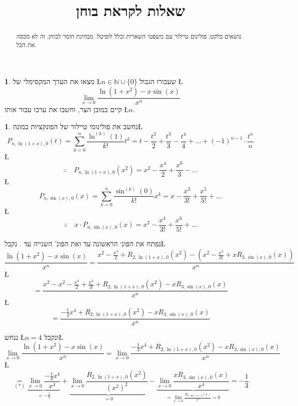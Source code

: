 \documentclass[english,hebrew]{article}
\theoremstyle{plain}
\theoremstyle{definition}
\newtheorem{problem}[thm]{\protect\problemname}
\theoremstyle{definition}
\newtheorem*{sol*}{\protect\solutionname}
\providecommand{\problemname}{בעיה}
\providecommand{\solutionname}{פתרון}
\begin{document}
\title{שאלות לקראת בוחן {\endL}}
\maketitle
\begin{abstract}
נושאים בלקט: פולינום טיילור עם משפטי השארית וכלל לופיטל. מבחינת חומר
לבוחן, זה לא מכסה את הכל.
\end{abstract}
\newpage{}
\begin{problem}
מצאו את הערך המקסימלי של \L{$n\in\mathbb{N}\cup\{0\}$} שעבורו הגבול
\L{%
\[
\lim_{x\to0}\frac{\ln(1+x^{2})-x\sin(x)}{x^{n}}
\]
}%
קיים במובן הצר, וחשבו את ערכו עבור אותו \L{$n$}.
\end{problem}

\begin{sol*}
נחשב את פולינומי טיילור של הפונקציות במונה\L{%
\[
P_{n,\ln\left(1+x\right),0}(t)=\underset{k=0}{\overset{n}{\sum}}\frac{\ln^{(k)}(1)}{k!}t^{k}=t-\frac{t^{2}}{2}+\frac{t^{3}}{3}-\frac{t^{4}}{4}+\dots+\left(-1\right)^{n-1}\cdot\frac{t^{n}}{n}
\]
}%
\L{%
\[
\therefore\quad P_{n,\ln\left(1+x\right),0}(x^{2})=x^{2}-\frac{x^{4}}{2}+\frac{x^{6}}{3}-\dots
\]
}%
\L{%
\[
P_{n,\sin(x),0}(x)=\underset{k=0}{\overset{n}{\sum}}\frac{\sin^{(k)}(0)}{k!}x^{k}=x-\frac{x^{3}}{3!}+\frac{x^{5}}{5!}+\dots
\]
}%
\L{%
\[
\therefore\quad x\cdot P_{n,\sin(x),0}(x)=x^{2}-\frac{x^{4}}{3!}+\frac{x^{6}}{5!}+\dots
\]
}%

נפתח את הפונ׳ הראשונה עד {\endL} ואת הפונ' השנייה עד {\endL}.
נקבל\L{%
\[
\frac{\ln(1+x^{2})-x\sin(x)}{x^{n}}=\frac{x^{2}-\frac{x^{4}}{2}+R_{2,\ln\left(1+x\right),0}\left(x^{2}\right)-\left(x^{2}-\frac{x^{4}}{3!}+xR_{3,\sin\left(x\right),0}(x)\right)}{x^{n}}
\]
}%
\L{%
\[
=\frac{x^{2}-x^{2}-\frac{x^{4}}{2}+\frac{x^{4}}{3!}+R_{2,\ln\left(1+x\right),0}\left(x^{2}\right)-xR_{3,\sin\left(x\right),0}(x)}{x^{n}}
\]
}%
\L{%
\[
=\frac{-\frac{1}{3}x^{4}+R_{2,\ln\left(1+x\right),0}\left(x^{2}\right)-xR_{3,\sin\left(x\right),0}(x)}{x^{n}}
\]
}%

ננחש \L{$n=4$} ונקבל\L{%
\[
\lim_{x\to0}\frac{\ln(1+x^{2})-x\sin(x)}{x^{n}}=\lim_{x\to0}\frac{-\frac{1}{3}x^{4}+R_{2,\ln\left(1+x\right),0}\left(x^{2}\right)-xR_{3,\sin\left(x\right),0}(x)}{x^{n}}
\]
}%
\L{%
\[
\underset{(*)}{=}\underset{=-\frac{1}{3}}{\underbrace{\lim_{x\to0}\frac{-\frac{1}{3}x^{4}}{x^{4}}}}+\underset{=0}{\underbrace{\lim_{x\to0}\frac{R_{2,\ln\left(1+x\right),0}\left(x^{2}\right)}{\left(x^{2}\right)^{2}}}}-\underset{=\lim_{x\to0}\frac{R_{3,\sin\left(x\right),0}(x)}{x^{3}}=0}{\underbrace{\lim_{x\to0}\frac{xR_{3,\sin\left(x\right),0}(x)}{x^{4}}}}=-\frac{1}{3}
\]
}%


\end{sol*}
\end{document}
